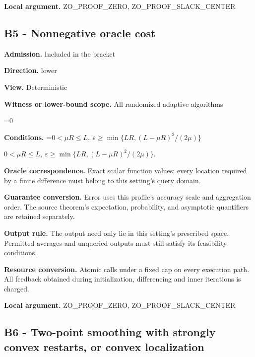 \documentclass[10pt,a4paper]{article}
\newcommand{\AtlasMath}[1]{\par\begingroup\centering\setbox0=\hbox{$\displaystyle #1$}\ifdim\wd0>1.4\linewidth\typeout{ATLAS WIDE FORMULA: \the\wd0}\fi\ifdim\wd0>\linewidth\resizebox{\linewidth}{!}{\box0}\else\box0\fi\par\endgroup}
\newcommand{\AtlasInlineMath}[1]{\begingroup\setbox0=\hbox{$#1$}\ifdim\wd0>.4\linewidth\endgroup\AtlasMath{#1}\else\endgroup$#1$\fi}
\begin{document}
\textbf{Local argument.} ZO\_PROOF\_ZERO, ZO\_PROOF\_SLACK\_CENTER



\subsection{B5 - Nonnegative oracle cost}


\textbf{Admission.} Included in the bracket



\textbf{Direction.} lower



\textbf{View.} Deterministic



\textbf{Witness or lower-bound scope.} All randomized adaptive algorithms



\AtlasMath{0}


\textbf{Conditions.} \AtlasInlineMath{0<\mu R\le L,\ \varepsilon\ge\min\{LR,(L-\mu R)^2/(2\mu)\}}.



\textbf{Oracle correspondence.} Exact scalar function values; every location required by a finite difference must belong to this setting's query domain.



\textbf{Guarantee conversion.} Error uses this profile's accuracy scale and aggregation order. The source theorem's expectation, probability, and asymptotic quantifiers are retained separately.



\textbf{Output rule.} The output need only lie in this setting's prescribed space. Permitted averages and unqueried outputs must still satisfy its feasibility conditions.



\textbf{Resource conversion.} Atomic calls under a fixed cap on every execution path. All feedback obtained during initialization, differencing and inner iterations is charged.



\textbf{Local argument.} ZO\_PROOF\_ZERO, ZO\_PROOF\_SLACK\_CENTER



\subsection{B6 - Two-point smoothing with strongly convex restarts, or convex localization}
\end{document}
